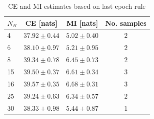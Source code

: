 \begin{table}[htbp]
\centering
\caption{CE and MI estimates based on last epoch rule}
\begin{tabular}{l |c |c |c}
\toprule

$N_B$ & CE [nats]& MI [nats]& No. samples\\
\midrule
4  & $37.92 \pm 0.44$ & $5.02 \pm 0.40$ & $2$ \\
6  & $38.10 \pm 0.97$ & $5.21 \pm 0.95$ & $2$ \\
8  & $39.34 \pm 0.78$ & $6.45 \pm 0.73$ & $2$ \\
15 & $39.50 \pm 0.37$ & $6.61 \pm 0.34$ & $3$ \\
16 & $39.57 \pm 0.35$ & $6.68 \pm 0.31$ & $3$ \\
25 & $39.24 \pm 0.63$ & $6.34 \pm 0.57$ & $2$ \\
30 & $38.33 \pm 0.98$ & $5.44 \pm 0.87$ & $1$ \\

\bottomrule
\end{tabular}
\end{table}